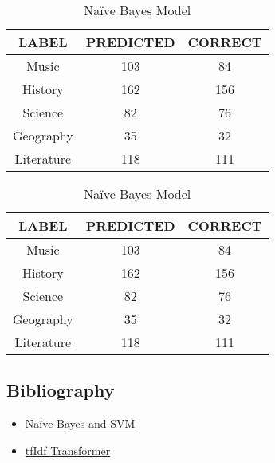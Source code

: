 \documentclass[11pt]{article}
\begin{document}
\begin{table}[!htb]
    \begin{minipage}{.5\linewidth}
      \centering
        \begin{tabular}{c|c|c}
           LABEL & PREDICTED & CORRECT\\\hline
Music & 103 & 84\\
History & 162 & 156\\
Science & 82 & 76\\
Geography & 35 & 32\\
Literature & 118 & 111\\\hline
        \end{tabular}
        \caption{SVM + TF-IDF Model}
    \end{minipage}%
    \begin{minipage}{.5\linewidth}
      \centering
        \begin{tabular}{c|c|c}
                LABEL & PREDICTED & CORRECT\\\hline
 Music & 103 & 84\\
History & 162 & 156\\
Science & 82 & 76\\
Geography & 35 & 32\\
Literature & 118 & 111\\\hline
        \end{tabular}
        \caption{Naïve Bayes Model}
    \end{minipage} 
\end{table}

\begin{multicols}{3}
\section{Bibliography }
\begin{itemize}

\item \href{https://aiiseasy.com/2019/06/09/text-classification-svm-naive-bayes-python/}{Naïve Bayes and SVM}
\newline

\item \href{https://scikit-learn.org/stable/modules/generated/sklearn.feature_extraction.text.TfidfTransformer.html}{tfIdf Transformer}
\end{itemize}
\end{multicols}
\end{document}
